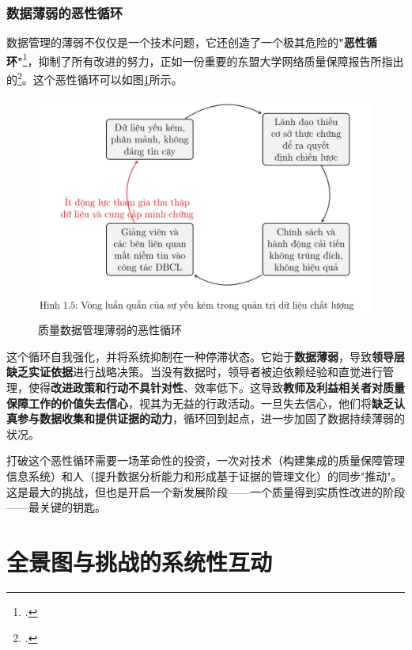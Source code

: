 \subsubsection{数据薄弱的恶性循环}
数据管理的薄弱不仅仅是一个技术问题，它还创造了一个极其危险的\textbf{"恶性循环"}\footcite{aunsec_redesigningIQA_2022}，抑制了所有改进的努力，正如一份重要的东盟大学网络质量保障报告所指出的\footcite{aunsec_redesigningIQA_2022}。这个恶性循环可以如图\ref{fig:vong_luan_quan}所示。

\begin{figure}[h!]
\centering
\includegraphics[width=\textwidth]{image/vong_lan_quan_trong_quan_tri_du_lieu_gd.jpg}
\caption{质量数据管理薄弱的恶性循环}
\label{fig:vong_luan_quan}
\end{figure}

这个循环自我强化，并将系统抑制在一种停滞状态。它始于\textbf{数据薄弱}，导致\textbf{领导层缺乏实证依据}进行战略决策。当没有数据时，领导者被迫依赖经验和直觉进行管理，使得\textbf{改进政策和行动不具针对性}、效率低下。这导致\textbf{教师及利益相关者对质量保障工作的价值失去信心}，视其为无益的行政活动。一旦失去信心，他们将\textbf{缺乏认真参与数据收集和提供证据的动力}，循环回到起点，进一步加固了数据持续薄弱的状况。

打破这个恶性循环需要一场革命性的投资，一次对技术（构建集成的质量保障管理信息系统）和人（提升数据分析能力和形成基于证据的管理文化）的同步"推动"。这是最大的挑战，但也是开启一个新发展阶段——一个质量得到实质性改进的阶段——最关键的钥匙。




\section{全景图与挑战的系统性互动}
\label{sec:buc_tranh_tong_hop}

